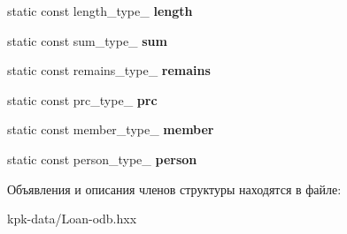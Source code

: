 \begin{DoxyCompactItemize}
\item 
static const length\+\_\+type\+\_\+ {\bfseries length}\hypertarget{structodb_1_1query__columns_3_01_1_1kpk_1_1data_1_1_loan_00_01id__pgsql_00_01_a_01_4_a65d84b8aab9f7d99ef7943a89d131679}{}\label{structodb_1_1query__columns_3_01_1_1kpk_1_1data_1_1_loan_00_01id__pgsql_00_01_a_01_4_a65d84b8aab9f7d99ef7943a89d131679}

\item 
static const sum\+\_\+type\+\_\+ {\bfseries sum}\hypertarget{structodb_1_1query__columns_3_01_1_1kpk_1_1data_1_1_loan_00_01id__pgsql_00_01_a_01_4_a0098bd1db52c8eaab549ede5cd51a978}{}\label{structodb_1_1query__columns_3_01_1_1kpk_1_1data_1_1_loan_00_01id__pgsql_00_01_a_01_4_a0098bd1db52c8eaab549ede5cd51a978}

\item 
static const remains\+\_\+type\+\_\+ {\bfseries remains}\hypertarget{structodb_1_1query__columns_3_01_1_1kpk_1_1data_1_1_loan_00_01id__pgsql_00_01_a_01_4_a294903331c829dc2866b2e33b307918a}{}\label{structodb_1_1query__columns_3_01_1_1kpk_1_1data_1_1_loan_00_01id__pgsql_00_01_a_01_4_a294903331c829dc2866b2e33b307918a}

\item 
static const prc\+\_\+type\+\_\+ {\bfseries prc}\hypertarget{structodb_1_1query__columns_3_01_1_1kpk_1_1data_1_1_loan_00_01id__pgsql_00_01_a_01_4_afced8ad546be3a2d6a7e866811fa91c3}{}\label{structodb_1_1query__columns_3_01_1_1kpk_1_1data_1_1_loan_00_01id__pgsql_00_01_a_01_4_afced8ad546be3a2d6a7e866811fa91c3}

\item 
static const member\+\_\+type\+\_\+ {\bfseries member}\hypertarget{structodb_1_1query__columns_3_01_1_1kpk_1_1data_1_1_loan_00_01id__pgsql_00_01_a_01_4_ab86f0766b5256431d334ce994d51a371}{}\label{structodb_1_1query__columns_3_01_1_1kpk_1_1data_1_1_loan_00_01id__pgsql_00_01_a_01_4_ab86f0766b5256431d334ce994d51a371}

\item 
static const person\+\_\+type\+\_\+ {\bfseries person}\hypertarget{structodb_1_1query__columns_3_01_1_1kpk_1_1data_1_1_loan_00_01id__pgsql_00_01_a_01_4_ab5924f1076ffd7875849ed1f6820416c}{}\label{structodb_1_1query__columns_3_01_1_1kpk_1_1data_1_1_loan_00_01id__pgsql_00_01_a_01_4_ab5924f1076ffd7875849ed1f6820416c}

\end{DoxyCompactItemize}


Объявления и описания членов структуры находятся в файле\+:\begin{DoxyCompactItemize}
\item 
kpk-\/data/Loan-\/odb.\+hxx\end{DoxyCompactItemize}
